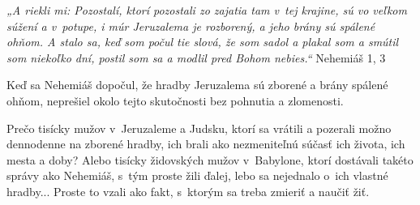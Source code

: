 








{\it „A riekli mi: Pozostalí, ktorí pozostali zo zajatia tam v~tej krajine, sú vo veľkom súžení a v~potupe, i múr Jeruzalema je rozborený, a jeho brány sú spálené ohňom. A stalo sa, keď som počul tie slová, že som sadol a plakal som a smútil som niekoľko dní, postil som sa a modlil pred Bohom nebies.“} Nehemiáš 1, 3

Keď sa Nehemiáš dopočul, že hradby Jeruzalema sú zborené a brány spálené ohňom, neprešiel okolo tejto skutočnosti bez pohnutia a zlomenosti.

Prečo tisícky mužov v~Jeruzaleme a Judsku, ktorí sa vrátili a pozerali možno dennodenne na zborené hradby, ich brali ako nezmeniteľnú súčasť ich života, ich mesta a doby? Alebo tisícky židovských mužov v~Babylone, ktorí dostávali takéto správy ako Nehemiáš, s~tým proste žili ďalej, lebo sa nejednalo o~ich vlastné hradby... Proste to vzali ako fakt, s~ktorým sa treba zmieriť a naučiť žiť.

